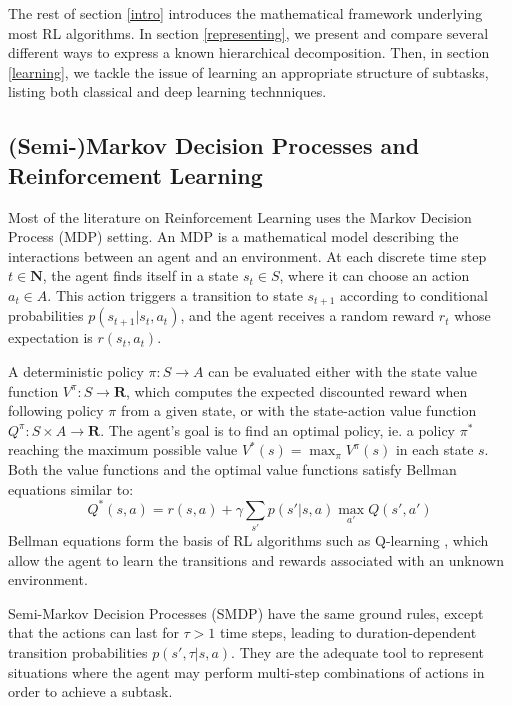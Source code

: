 \documentclass{article}
\newcommand{\Nn}{\mathbf{N}}
\newcommand{\Rr}{\mathbf{R}}
\begin{document}
The rest of section \ref{intro} introduces the mathematical framework underlying most RL algorithms. In section \ref{representing}, we present and compare several different ways to express a known hierarchical decomposition. Then, in section \ref{learning}, we tackle the issue of learning an appropriate structure of subtasks, listing both classical and deep learning technniques.

\subsection{(Semi-)Markov Decision Processes and Reinforcement Learning}

Most of the literature on Reinforcement Learning uses the Markov Decision Process (MDP) setting. An MDP is a mathematical model describing the interactions between an agent and an environment. At each discrete time step $t \in \Nn$, the agent finds itself in a state $s_t \in S$, where it can choose an action $a_t \in A$. This action triggers a transition to state $s_{t+1}$ according to conditional probabilities $p(s_{t+1} | s_t, a_t)$, and the agent receives a random reward $r_t$ whose expectation is $r(s_t, a_t)$.

A deterministic policy $\pi: S \to A$ can be evaluated either with the state value function $V^{\pi}: S \to \Rr$, which computes the expected discounted reward when following policy $\pi$ from a given state, or with the state-action value function $Q^{\pi}: S \times A \to \Rr$. The agent's goal is to find an optimal policy, ie. a policy $\pi^*$ reaching the maximum possible value $V^*(s) = \max_{\pi} V^{\pi}(s)$ in each state $s$. Both the value functions and the optimal value functions satisfy Bellman equations similar to:
\begin{equation}
    Q^* (s, a) = r(s, a) + \gamma \sum_{s'}{p(s' | s, a) \max_{a'}{Q(s', a')}}
\end{equation}
Bellman equations form the basis of RL algorithms such as Q-learning \cite{watkins_q-learning_1992}, which allow the agent to learn the transitions and rewards associated with an unknown environment.

Semi-Markov Decision Processes (SMDP) have the same ground rules, except that the actions can last for $\tau > 1$ time steps, leading to duration-dependent transition probabilities $p(s', \tau | s, a)$. They are the adequate tool to represent situations where the agent may perform multi-step combinations of actions in order to achieve a subtask.
\end{document}

